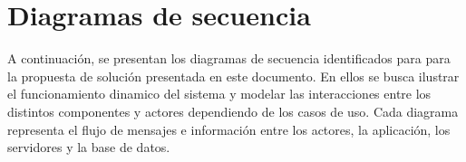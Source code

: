 \section{Diagramas de secuencia}

A continuación, se presentan los diagramas de secuencia identificados para para la propuesta de solución presentada en este documento.
En ellos se busca ilustrar el funcionamiento dinamico del sistema y modelar las interacciones entre los distintos componentes y actores dependiendo de los casos de uso.
Cada diagrama representa el flujo de mensajes e información entre los actores, la aplicación, los servidores y la base de datos.

\newpage









































%

%

%

%

%

%

%

%

%

%

%

%






